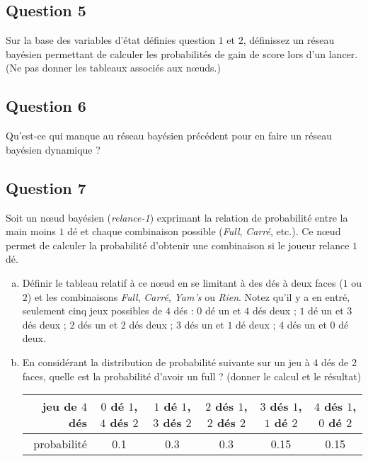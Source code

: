\documentclass[a4paper, 10pt]{article}
\begin{document}
  \subsection*{Question 5}%
  
   Sur la base des variables d'état définies question $1$ et $2$, définissez un réseau bayésien permettant de calculer les probabilités de gain de score lors d'un lancer. (Ne pas donner les tableaux associés aux n\oe{}uds.)
  
  \subsection*{Question 6}%
  
  Qu'est-ce qui manque au réseau bayésien précédent pour en faire un réseau bayésien dynamique ?
 
  \subsection*{Question 7}%
  
  Soit un n\oe{}ud bayésien (\emph{relance-1}) exprimant la relation de probabilité entre la main moins $1$ dé et chaque combinaison possible (\emph{Full},  \emph{Carré}, etc.). Ce n\oe{}ud permet de calculer la probabilité d'obtenir une combinaison si le joueur relance $1$ dé.
  
  \begin{enumerate}[(a)]
    \item Définir le tableau relatif à ce n\oe{}ud en se limitant à des dés à deux faces ($1$ ou $2$) et les combinaisons \emph{Full},  \emph{Carré}, \emph{Yam's} ou \emph{Rien}. Notez qu'il y a en entré, seulement cinq jeux possibles de $4$ dés : $0$ dé un et $4$ dés deux ; $1$ dé un et $3$ dés deux ; $2$ dés un et $2$ dés deux ; $3$ dés un et $1$ dé deux ; $4$ dés un et $0$ dé deux.

    \item En considérant la distribution de probabilité suivante sur un jeu à $4$ dés de $2$ faces, quelle est la probabilité d'avoir un full ? (donner le calcul et le résultat)
    
    \begin{center}
     \small
    \begin{tabular}{|r|c|c| c|c|c|}
      \hline
      jeu de $4$ dés & $0$ dé $1$, $4$ dés $2$ & $1$ dé $1$, $3$ dés $2$ & $2$ dés $1$, $2$ dés $2$ & $3$ dés $1$, $1$ dé $2$ & $4$ dés $1$, $0$ dé $2$ \\
      \hline
      probabilité & 0.1 & 0.3 & 0.3 & 0.15 & 0.15 \\
      \hline
    \end{tabular}
    
    \end{center}

  \end{enumerate}
\end{document}
